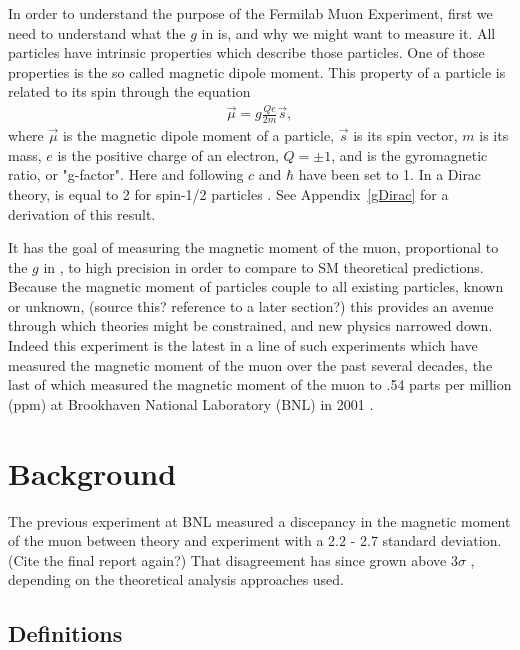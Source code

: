 In order to understand the purpose of the Fermilab Muon \gmtwo Experiment, first we need to understand what the $g$ in \gmtwo is, and why we might want to measure it. All particles have intrinsic properties which describe those particles. One of those properties is the so called magnetic dipole moment. This property of a particle is related to its spin through the equation
		\begin{align}
            \vec{\mu} = g \frac{Qe}{2m} \vec{s},
        \label{eq:magneticmoment}
		\end{align}
where $\vec{\mu}$ is the magnetic dipole moment of a particle, $\vec{s}$ is its spin vector, $m$ is its mass, $e$ is the positive charge of an electron, $Q = \pm1$, and \g is the gyromagnetic ratio, or "g-factor". Here and following $c$ and $\hbar$ have been set to 1. In a Dirac theory, \g is equal to 2 for spin-1/2 particles \cite{cite dirac or something}. See Appendix~\ref{gDirac} for a derivation of this result.



It has the goal of measuring the magnetic moment of the muon, proportional to the $g$ in \gmtwo, to high precision in order to compare to SM theoretical predictions. Because the magnetic moment of particles couple to all existing particles, known or unknown, (source this? reference to a later section?) this provides an avenue through which theories might be constrained, and new physics narrowed down. Indeed this experiment is the latest in a line of such experiments which have measured the magnetic moment of the muon over the past several decades, the last of which measured the magnetic moment of the muon to .54 parts per million (ppm) at Brookhaven National Laboratory (BNL) in 2001 \cite{E821FinalReport}.


\section{Background}
\label{sec:Background}

The previous \gmtwo experiment at BNL measured a discepancy in the magnetic moment of the muon between theory and experiment with a 2.2 - 2.7 standard deviation. (Cite the final report again?) That disagreement has since grown above 3$\sigma$ \cite{Keshavarzi:2018mgv}, depending on the theoretical analysis approaches used.


\subsection{Definitions}
\label{subsec:Definitions}




